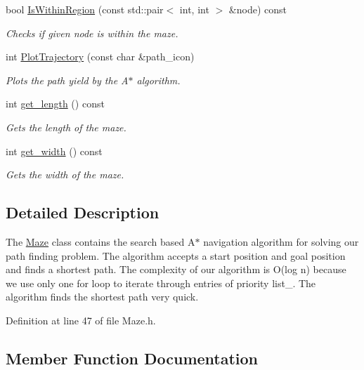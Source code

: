 \begin{DoxyCompactItemize}
bool \mbox{\hyperlink{class_maze_a06408850380011c55b73831a2d6d08e1}{Is\+Within\+Region}} (const std\+::pair$<$ int, int $>$ \&node) const
\begin{DoxyCompactList}\small\item\em Checks if given node is within the maze. \end{DoxyCompactList}\item 
int \mbox{\hyperlink{class_maze_aa5b63e5c120410dda38853a443022b52}{Plot\+Trajectory}} (const char \&path\+\_\+icon)
\begin{DoxyCompactList}\small\item\em Plots the path yield by the A$\ast$ algorithm. \end{DoxyCompactList}\item 
int \mbox{\hyperlink{class_maze_a763b16546d7ab2f18919ad1506a8dc5a}{get\+\_\+length}} () const
\begin{DoxyCompactList}\small\item\em Gets the length of the maze. \end{DoxyCompactList}\item 
int \mbox{\hyperlink{class_maze_a5210be39a897f9e9058b27ea09852a86}{get\+\_\+width}} () const
\begin{DoxyCompactList}\small\item\em Gets the width of the maze. \end{DoxyCompactList}\end{DoxyCompactItemize}


\subsection{Detailed Description}
The \mbox{\hyperlink{class_maze}{Maze}} class contains the search based A$\ast$ navigation algorithm for solving our path finding problem. The algorithm accepts a start position and goal position and finds a shortest path. The complexity of our algorithm is O(log n) because we use only one for loop to iterate through entries of priority list\+\_\+. The algorithm finds the shortest path very quick. 

Definition at line 47 of file Maze.\+h.



\subsection{Member Function Documentation}
\mbox{\label{class_maze_a1786d0ad38f1382bfd881ef38f53242c}} 
